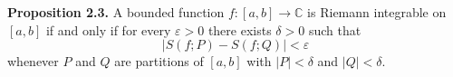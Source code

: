 \textbf{Proposition 2.3.} A bounded function $f: [a, b] \to \mathbb{C}$ is Riemann integrable on $[a, b]$ if and only if for every $\varepsilon > 0$ there exists $\delta > 0$ such that
$$|S(f; P) - S(f; Q)| < \varepsilon$$
whenever $P$ and $Q$ are partitions of $[a, b]$ with $|P| < \delta$ and $|Q| < \delta$.

